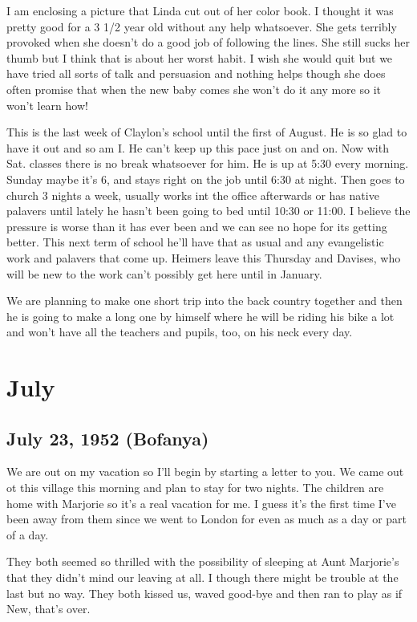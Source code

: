 \documentclass[
]{book}
\begin{document}
I am enclosing a picture that Linda cut out of her color book. I thought it was pretty good for a 3 1/2 year old without any help whatsoever. She gets terribly provoked when she doesn't do a good job of following the lines. She still sucks her thumb but I think that is about her worst habit. I wish she would quit but we have tried all sorts of talk and persuasion and nothing helps though she does often promise that when the new baby comes she won't do it any more so it won't learn how!

This is the last week of Claylon's school until the first of August. He is so glad to have it out and so am I. He can't keep up this pace just on and on. Now with Sat. classes there is no break whatsoever for him. He is up at 5:30 every morning. Sunday maybe it's 6, and stays right on the job until 6:30 at night. Then goes to church 3 nights a week, usually works int the office afterwards or has native palavers until lately he hasn't been going to bed until 10:30 or 11:00. I believe the pressure is worse than it has ever been and we can see no hope for its getting better. This next term of school he'll have that as usual and any evangelistic work and palavers that come up. Heimers leave this Thursday and Davises, who will be new to the work can't possibly get here until in January.

We are planning to make one short trip into the back country together and then he is going to make a long one by himself where he will be riding his bike a lot and won't have all the teachers and pupils, too, on his neck every day.

\hypertarget{july-3}{%
\section{July}\label{july-3}}

\hypertarget{july-23-1952-bofanya}{%
\subsection{July 23, 1952 (Bofanya)}\label{july-23-1952-bofanya}}

We are out on my vacation so I'll begin by starting a letter to you. We came out ot this village this morning and plan to stay for two nights. The children are home with Marjorie so it's a real vacation for me. I guess it's the first time I've been away from them since we went to London for even as much as a day or part of a day.

They both seemed so thrilled with the possibility of sleeping at Aunt Marjorie's that they didn't mind our leaving at all. I though there might be trouble at the last but no way. They both kissed us, waved good-bye and then ran to play as if New, that's over.
\end{document}
